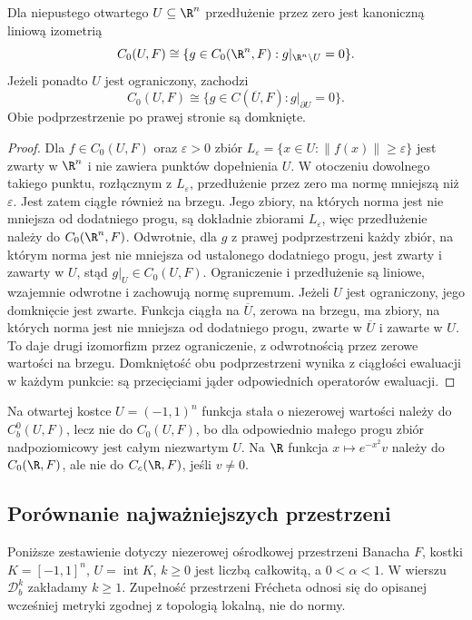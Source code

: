 \begin{stwierdzenie}
\label{ma2:prop:c0-zero-extension}
Dla niepustego otwartego $U\subseteq\R^n$
przedłużenie przez zero jest kanoniczną
liniową izometrią
\[
 C_0(U,F)\cong
 \{g\in C_0(\R^n,F):g|_{\R^n\setminus U}=0\}.
\]
Jeżeli ponadto $U$ jest ograniczony, zachodzi
\[
 C_0(U,F)\cong
 \{g\in C(\overline U,F):g|_{\partial U}=0\}.
\]
Obie podprzestrzenie po prawej stronie są domknięte.
\end{stwierdzenie}
\begin{proof}
Dla $f\in C_0(U,F)$ oraz $\varepsilon>0$ zbiór
$L_\varepsilon=\{x\in U:\|f(x)\|\ge\varepsilon\}$
jest zwarty w $\R^n$ i nie zawiera punktów
dopełnienia $U$. W otoczeniu dowolnego takiego
punktu, rozłącznym z $L_\varepsilon$, przedłużenie
przez zero ma normę mniejszą niż $\varepsilon$.
Jest zatem ciągłe również na brzegu.
Jego zbiory, na których norma jest nie mniejsza od dodatniego progu,
są dokładnie zbiorami $L_\varepsilon$, więc
przedłużenie należy do $C_0(\R^n,F)$.
Odwrotnie, dla $g$ z prawej podprzestrzeni
każdy zbiór, na którym norma jest nie mniejsza od ustalonego dodatniego progu, jest zwarty
i zawarty w $U$, stąd $g|_U\in C_0(U,F)$.
Ograniczenie i przedłużenie są liniowe,
wzajemnie odwrotne i zachowują normę supremum.
Jeżeli $U$ jest ograniczony, jego domknięcie
jest zwarte. Funkcja ciągła na $\overline U$,
zerowa na brzegu, ma zbiory, na których norma jest nie mniejsza od dodatniego progu,
zwarte w $\overline U$ i zawarte w $U$.
To daje drugi izomorfizm przez ograniczenie,
z odwrotnością przez zerowe wartości na brzegu.
Domkniętość obu podprzestrzeni wynika z ciągłości
ewaluacji w każdym punkcie: są przecięciami
jąder odpowiednich operatorów ewaluacji.
\end{proof}

Na otwartej kostce $U=(-1,1)^n$ funkcja
stała o niezerowej wartości należy
do $C_b^0(U,F)$, lecz nie do $C_0(U,F)$,
bo dla odpowiednio małego progu zbiór
nadpoziomicowy jest całym niezwartym $U$.
Na $\R$ funkcja $x\mapsto e^{-x^2}v$
należy do $C_0(\R,F)$, ale nie do
$C_c(\R,F)$, jeśli $v\ne0$.

\subsection{Porównanie najważniejszych przestrzeni}

Poniższe zestawienie dotyczy niezerowej
ośrodkowej przestrzeni Banacha $F$,
kostki $K=[-1,1]^n$, $U=\operatorname{int}K$,
$k\ge0$ jest liczbą całkowitą, a $0<\alpha<1$.
W wierszu
$\mathcal D_b^k$ zakładamy $k\ge1$.
Zupełność przestrzeni Frécheta odnosi się
do opisanej wcześniej metryki zgodnej
z topologią lokalną, nie do normy.

